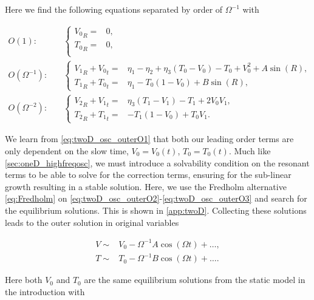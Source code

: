 Here we find the following equations separated by order of $\Omega^{-1}$ with

\begin{align}
\label{eq:twoD_osc_outerO1}
O(1):\quad & \begin{cases}
	{V_0}_R =& 0, \\
	{T_0}_R =& 0,\\
\end{cases}\\
\label{eq:twoD_osc_outerO2}
O(\Omega^{-1}):\quad & \begin{cases}
	{V_1}_R+{V_0}_t = & \eta_1-\eta_2+\eta_3(T_0-V_0)-T_0+V_0^2+A\sin(R),\\
	 {T_1}_R +{T_0}_t =& \eta_1-T_0(1-V_0)+B\sin(R),
\end{cases}\\
\label{eq:twoD_osc_outerO3}
O(\Omega^{-2}):\quad & \begin{cases}
	{V_2}_R+{V_1}_t = & \eta_3(T_1-V_1)-T_1+2V_0V_1,\\
	 {T_2}_R +{T_1}_t =& -T_1(1-V_0)+T_0V_1.
\end{cases}
\end{align}

We learn from \eqref{eq:twoD_osc_outerO1} that both our leading order terms are only dependent on the slow time, $V_0=V_0(t)$, $T_0=T_0(t)$. Much like \autoref{sec:oneD_highfreqosc}, we must introduce a solvability condition on the resonant terms to be able to solve for the correction terms, ensuring for the sub-linear growth resulting in a stable solution. Here, we use the Fredholm alternative \eqref{eq:Fredholm} on \eqref{eq:twoD_osc_outerO2}-\eqref{eq:twoD_osc_outerO3} and search for the equilibrium solutions. This is shown in \autoref{app:twoD}. Collecting these solutions leads to the outer solution in original variables

\begin{equation}\label{eq:twoD_osc_outersoln}
\begin{aligned}
V\sim& V_0-\Omega^{-1} A\cos(\Omega t)+\dots,\\
T\sim& T_0-\Omega^{-1} B\cos(\Omega t)+\ldots.%
\end{aligned}
\end{equation}

Here both $V_0$ and $T_0$ are the same equilibrium solutions from the static model in the introduction with

